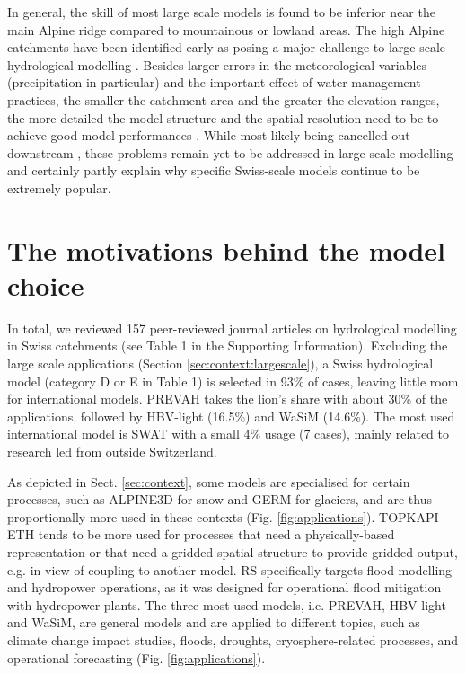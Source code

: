 \documentclass[10pt,a4paper]{article}
\begin{document}
In general, the skill of most large scale models is found to be inferior near the main Alpine ridge compared to mountainous or lowland areas. The high Alpine catchments have been identified early as posing a major challenge to large scale hydrological modelling \citep{Kleinn2005}.  Besides larger errors in the meteorological variables (precipitation in particular) and the important effect of water management practices, the smaller the catchment area and the greater the elevation ranges, the more detailed the model structure and the spatial resolution need to be to achieve good model performances \citep{Gurtz2003}. While most likely being cancelled out downstream \citep{Kleinn2005}, these problems remain yet to be addressed in large scale modelling and certainly partly explain why specific Swiss-scale models continue to be extremely popular. 


\section{The motivations behind the model choice}
\label{sec:motivations}

In total, we reviewed 157 peer-reviewed journal articles on hydrological modelling in Swiss catchments (see Table 1 in the Supporting Information). Excluding the large scale applications (Section \ref{sec:context:largescale}), a Swiss hydrological model (category D or E in Table 1) is selected in 93\% of cases, leaving little room for international models. PREVAH takes the lion's share with about 30\% of the applications, followed by HBV-light (16.5\%) and WaSiM (14.6\%). The most used international model is SWAT with a small 4\% usage (7 cases), mainly related to research led from outside Switzerland.

As depicted in Sect. \ref{sec:context}, some models are specialised for certain processes, such as ALPINE3D for snow and GERM for glaciers, and are thus proportionally more used in these contexts (Fig. \ref{fig:applications}). TOPKAPI-ETH tends to be more used for processes that need a physically-based representation or that need a gridded spatial structure to provide gridded output, e.g. in view of coupling to another model. RS specifically targets flood modelling and hydropower operations, as it was designed for operational flood mitigation with hydropower plants. The three most used models, i.e. PREVAH, HBV-light and WaSiM, are general models and are applied to different topics, such as climate change impact studies, floods, droughts, cryosphere-related processes, and operational forecasting (Fig. \ref{fig:applications}).
\end{document}

